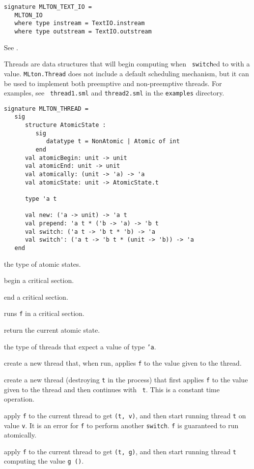 \begin{verbatim}
signature MLTON_TEXT_IO =
   MLTON_IO
   where type instream = TextIO.instream
   where type outstream = TextIO.outstream
\end{verbatim}

See .

Threads are data structures that will begin computing when {\tt
switch}ed to with a value.  {\tt MLton.Thread} does not include a
default scheduling mechanism, but it can be used to implement both
preemptive and non-preemptive threads.  For examples, see {\tt
thread1.sml} and {\tt thread2.sml} in the {\tt examples} directory.
\begin{verbatim}
signature MLTON_THREAD =
   sig
      structure AtomicState :
         sig
            datatype t = NonAtomic | Atomic of int
         end
      val atomicBegin: unit -> unit
      val atomicEnd: unit -> unit
      val atomically: (unit -> 'a) -> 'a
      val atomicState: unit -> AtomicState.t

      type 'a t

      val new: ('a -> unit) -> 'a t
      val prepend: 'a t * ('b -> 'a) -> 'b t
      val switch: ('a t -> 'b t * 'b) -> 'a
      val switch': ('a t -> 'b t * (unit -> 'b)) -> 'a
   end
\end{verbatim}

\begin{description}

the type of atomic states.

begin a critical section.

end a critical section.

runs {\tt f} in a critical section.

return the current atomic state.

the type of threads that expect a value of type {\tt 'a}.

create a new thread that, when run, applies {\tt f} to the
value given to the thread. 

create a new thread (destroying {\tt t} in the process) that first applies
{\tt f} to the value given to the thread and then continues with {\tt
t}.  This is a constant time operation.

apply {\tt f} to the current thread to get {\tt (t, v)}, and then
start running thread {\tt t} on value {\tt v}.  It is an error for
{\tt f} to perform another {\tt switch}.  {\tt f} is guaranteed
to run atomically.

apply {\tt f} to the current thread to get {\tt (t, g)}, and then
start running thread {\tt t} computing the value {\tt g ()}.

\end{description}
%
